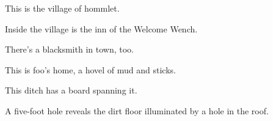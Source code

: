 \documentclass[letterpaper,10pt,twoside,twocolumn,openany]{dndbook}
\begin{document}
This is the village of hommlet.

Inside the village is the inn of the Welcome Wench.

There's a blacksmith in town, too.

This is foo's home, a hovel of mud and sticks.

This ditch has a board spanning it.

A five-foot hole reveals the dirt floor illuminated by a hole in the roof.

\end{document}
